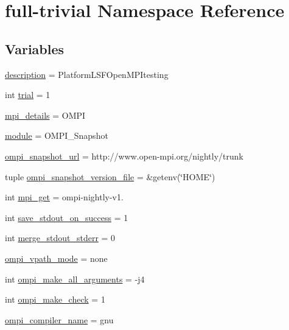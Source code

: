 \hypertarget{namespacefull-trivial}{\section{full-\/trivial Namespace Reference}
\label{namespacefull-trivial}
}
\subsection*{Variables}
\begin{DoxyCompactItemize}
\item 
\hyperlink{namespacefull-trivial_ad3a7f6605e8fa1721ffb53150f1b1f2b}{description} = Platform\-L\-S\-F\-Open\-M\-P\-Itesting
\item 
int \hyperlink{namespacefull-trivial_a431381ca4d3ce0533b84fdf824145c45}{trial} = 1
\item 
\hyperlink{namespacefull-trivial_ac8c1b563f56da3a28444d9ba8c6e9cc9}{mpi\-\_\-details} = O\-M\-P\-I
\item 
\hyperlink{namespacefull-trivial_ac8f46360931db54c90bacdbeb7de743d}{module} = O\-M\-P\-I\-\_\-\-Snapshot
\item 
\hyperlink{namespacefull-trivial_ad99b4206b0691dff98229634af7de89e}{ompi\-\_\-snapshot\-\_\-url} = http\-://www.\-open-\/mpi.\-org/nightly/trunk
\item 
tuple \hyperlink{namespacefull-trivial_a8cb0b5677b37b7bb5ee95a14399ff9a3}{ompi\-\_\-snapshot\-\_\-version\-\_\-file} = \&getenv(\char`\"{}H\-O\-M\-E\char`\"{})
\item 
int \hyperlink{namespacefull-trivial_a27abf09427482f97a0072b3be7e6601d}{mpi\-\_\-get} = ompi-\/nightly-\/v1.
\item 
int \hyperlink{namespacefull-trivial_aa9f5860b95aa3cfb3deaa3cf840b5615}{save\-\_\-stdout\-\_\-on\-\_\-success} = 1
\item 
int \hyperlink{namespacefull-trivial_abffbc48fc37ad6d7010976ca874c845f}{merge\-\_\-stdout\-\_\-stderr} = 0
\item 
\hyperlink{namespacefull-trivial_a58c9dd08bbe532a5face257efa5cbd3e}{ompi\-\_\-vpath\-\_\-mode} = none
\item 
int \hyperlink{namespacefull-trivial_a5a973d684d1c8c9442df7cd698a3cd03}{ompi\-\_\-make\-\_\-all\-\_\-arguments} = -\/j4
\item 
int \hyperlink{namespacefull-trivial_a84b104cbca5b5b6e7d726de01ad3947f}{ompi\-\_\-make\-\_\-check} = 1
\item 
\hyperlink{namespacefull-trivial_ab1eddfc5389978f354d58c7637810d41}{ompi\-\_\-compiler\-\_\-name} = gnu

\end{DoxyCompactItemize}
